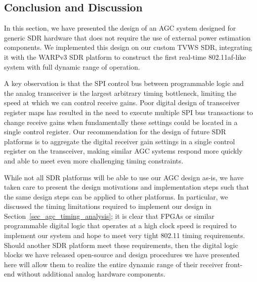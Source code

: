 \subsection{Conclusion and Discussion}
\label{sec_agc_conclusion}


	In this section, we have presented the design of an \acf{AGC} system designed for generic \ac{SDR} hardware that does not require the use of external power estimation components.
	We implemented this design on our custom \ac{TVWS} \ac{SDR}, integrating it with the WARPv3 \ac{SDR} platform to construct the first real-time 802.11af-like system with full dynamic range of operation.
	
	A key observation is that the \ac{SPI} control bus between programmable logic and the analog transceiver is the largest arbitrary timing bottleneck, limiting the speed at which we can control receive gains.
	Poor digital design of transceiver register maps has resulted in the need to execute multiple \ac{SPI} bus transactions to change receive gains when fundamentally these settings could be located in a single control register.
	Our recommendation for the design of future \ac{SDR} platforms is to aggregate the digital receiver gain settings in a single control register on the transceiver, making similar \ac{AGC} systems respond more quickly and able to meet even more challenging timing constraints.
	
		While not all \ac{SDR} platforms will be able to use our \ac{AGC} design as-is, we have taken care to present the design motivations and implementation steps such that the same design steps can be applied to other platforms.
	In particular, we discussed the timing limitations required to implement our design in Section~\ref{sec_agc_timing_analysis}; it is clear that \acp{FPGA} or similar programmable digital logic that operates at a high clock speed is required to implement our system and hope to meet very tight 802.11 timing requirements.
	Should another \ac{SDR} platform meet these requirements, then the digital logic blocks we have released open-source \cite{guerra2012pcores} and design procedures we have presented here will allow them to realize the entire dynamic range of their receiver front-end without additional analog hardware components.

